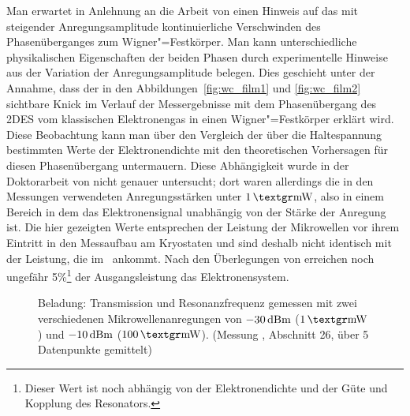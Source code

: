 Man erwartet in Anlehnung an die Arbeit von  \ea{} \cite{Jia89} einen Hinweis auf das mit steigender Anregungsamplitude kontinuierliche Verschwinden des Phasenüberganges zum Wigner"=Festkörper. Man kann unterschiedliche physikalischen  Eigenschaften der beiden Phasen durch experimentelle Hinweise aus der Variation der Anregungsamplitude belegen. Dies geschieht unter der Annahme, dass der in den Abbildungen~\ref{fig:wc_film1} und \ref{fig:wc_film2} sichtbare Knick im Verlauf der Messergebnisse mit dem Phasenübergang des 2DES vom klassischen Elektronengas in einen Wigner"=Festkörper erklärt wird. Diese Beobachtung kann man über den Vergleich der über die Haltespannung bestimmten Werte der Elektronendichte mit den theoretischen Vorhersagen für diesen Phasenübergang untermauern. Diese Abhängigkeit wurde in der Doktorarbeit von  \cite{guenzler} nicht genauer untersucht; dort waren allerdings die in den Messungen verwendeten Anregungsstärken unter $\unit[1]{\grmu W}$, also in einem Bereich in dem das Elektronensignal unabhängig von der Stärke der Anregung ist. Die hier gezeigten Werte entsprechen der Leistung der Mikrowellen vor ihrem Eintritt in den Messaufbau am Kryostaten und sind deshalb nicht identisch mit der Leistung, die im \HR\ ankommt. Nach den Überlegungen von  \cite{guenzler} erreichen noch ungefähr 5\%\footnote{Dieser Wert ist noch abhängig von der Elektronendichte und der Güte und Kopplung des Resonators.} der Ausgangsleistung das Elektronensystem.

\begin{figure}[h!tb]
    \centerline{%
    \hfill%
    }
    
    \caption[Transmission und Resonanzfrequenz bei zwei verschiedenen Mikrowellenamplituden]{Beladung: Transmission und Resonanzfrequenz gemessen mit zwei verschiedenen Mikrowellenanregungen von $\unit[-30]{dBm}$ ($\unit[1]{\grmu W}$) und $\unit[-10]{dBm}$ ($\unit[100]{\grmu W}$). (Messung , Abschnitt 26, über 5 Datenpunkte gemittelt)}
    
\end{figure}

